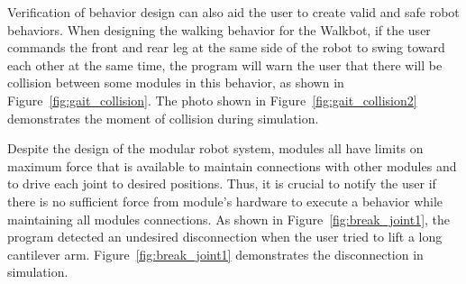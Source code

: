 \documentclass[graybox]{svmult}
\begin{document}
Verification of behavior design can also aid the user to create valid and safe robot behaviors. When designing the walking behavior for the Walkbot, if the user commands the front and rear leg at the same side of the robot to swing toward each other at the same time, the program will warn the user that there will be collision between some modules in this behavior, as shown in Figure~\ref{fig:gait_collision}. The photo shown in Figure~\ref{fig:gait_collision2} demonstrates the moment of collision during simulation.

Despite the design of the modular robot system, modules all have limits on maximum force that is available to maintain connections with other modules and to drive each joint to desired positions. Thus, it is crucial to notify the user if there is no sufficient force from module's hardware to execute a behavior while maintaining all modules connections. 
As shown in Figure~\ref{fig:break_joint1}, the program detected an undesired disconnection when the user tried to lift a long cantilever arm. Figure~\ref{fig:break_joint1} demonstrates the disconnection in simulation.
 
\end{document}
